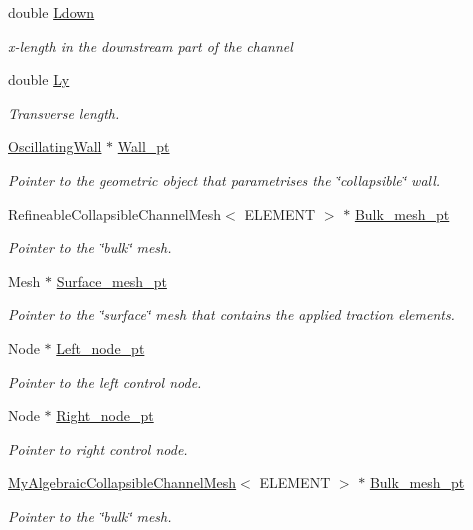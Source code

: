 \begin{DoxyCompactItemize}
double \hyperlink{classCollapsibleChannelProblem_a5beb774a744bc7b7b1b821cb96bb445e}{Ldown}
\begin{DoxyCompactList}\small\item\em x-\/length in the downstream part of the channel \end{DoxyCompactList}\item 
double \hyperlink{classCollapsibleChannelProblem_a7d600ad0b7326eda8d3bcbfde97b40cd}{Ly}
\begin{DoxyCompactList}\small\item\em Transverse length. \end{DoxyCompactList}\item 
\hyperlink{classOscillatingWall}{Oscillating\+Wall} $\ast$ \hyperlink{classCollapsibleChannelProblem_a54065436b8f884469ed80eae6fe67a5c}{Wall\+\_\+pt}
\begin{DoxyCompactList}\small\item\em Pointer to the geometric object that parametrises the \char`\"{}collapsible\char`\"{} wall. \end{DoxyCompactList}\item 
Refineable\+Collapsible\+Channel\+Mesh$<$ E\+L\+E\+M\+E\+NT $>$ $\ast$ \hyperlink{classCollapsibleChannelProblem_acd96e5a1d72cc3a1aad196c97dcb3883}{Bulk\+\_\+mesh\+\_\+pt}
\begin{DoxyCompactList}\small\item\em Pointer to the \char`\"{}bulk\char`\"{} mesh. \end{DoxyCompactList}\item 
Mesh $\ast$ \hyperlink{classCollapsibleChannelProblem_a29f213b46b1c34851ff74e937444d04e}{Surface\+\_\+mesh\+\_\+pt}
\begin{DoxyCompactList}\small\item\em Pointer to the \char`\"{}surface\char`\"{} mesh that contains the applied traction elements. \end{DoxyCompactList}\item 
Node $\ast$ \hyperlink{classCollapsibleChannelProblem_a479d0dce7e090898f696505927a56cf8}{Left\+\_\+node\+\_\+pt}
\begin{DoxyCompactList}\small\item\em Pointer to the left control node. \end{DoxyCompactList}\item 
Node $\ast$ \hyperlink{classCollapsibleChannelProblem_ae02af6e90ea562b9fd8091bdd1ff972f}{Right\+\_\+node\+\_\+pt}
\begin{DoxyCompactList}\small\item\em Pointer to right control node. \end{DoxyCompactList}\item 
\hyperlink{classoomph_1_1MyAlgebraicCollapsibleChannelMesh}{My\+Algebraic\+Collapsible\+Channel\+Mesh}$<$ E\+L\+E\+M\+E\+NT $>$ $\ast$ \hyperlink{classCollapsibleChannelProblem_a0c3c4c226afe7d14f6967ac6d28ff15f}{Bulk\+\_\+mesh\+\_\+pt}
\begin{DoxyCompactList}\small\item\em Pointer to the \char`\"{}bulk\char`\"{} mesh. \end{DoxyCompactList}\end{DoxyCompactItemize}


